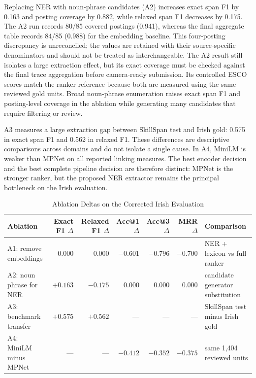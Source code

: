 \documentclass[conference]{IEEEtran}
\begin{document}
Replacing NER with noun-phrase candidates (A2) increases exact span F1 by 0.163 and posting coverage by 0.882, while relaxed span F1 decreases by 0.175. The A2 run records 80/85 covered postings (0.941), whereas the final aggregate table records 84/85 (0.988) for the embedding baseline. This four-posting discrepancy is unreconciled; the values are retained with their source-specific denominators and should not be treated as interchangeable. The A2 result still isolates a large extraction effect, but its exact coverage must be checked against the final trace aggregation before camera-ready submission. Its controlled ESCO scores match the ranker reference because both are measured using the same reviewed gold units. Broad noun-phrase enumeration raises exact span F1 and posting-level coverage in the ablation while generating many candidates that require filtering or review.

A3 measures a large extraction gap between SkillSpan test and Irish gold: 0.575 in exact span F1 and 0.562 in relaxed F1. These differences are descriptive comparisons across domains and do not isolate a single cause. In A4, MiniLM is weaker than MPNet on all reported linking measures. The best encoder decision and the best complete pipeline decision are therefore distinct: MPNet is the stronger ranker, but the proposed NER extractor remains the principal bottleneck on the Irish evaluation.

\begin{table}[!t]
\caption{Ablation Deltas on the Corrected Irish Evaluation}
\label{tab:ablations}
\centering
\small
\begin{tabular}{lrrrrrl}
\toprule
Ablation & Exact F1 $\Delta$ & Relaxed F1 $\Delta$ & Acc@1 $\Delta$ & Acc@3 $\Delta$ & MRR $\Delta$ & Comparison \\
\midrule
A1: remove embeddings & 0.000 & 0.000 & $-0.601$ & $-0.796$ & $-0.700$ & NER + lexicon vs full ranker \\
A2: noun phrase for NER & $+0.163$ & $-0.175$ & 0.000 & 0.000 & 0.000 & candidate generator substitution \\
A3: benchmark transfer & $+0.575$ & $+0.562$ & --- & --- & --- & SkillSpan test minus Irish gold \\
A4: MiniLM minus MPNet & --- & --- & $-0.412$ & $-0.352$ & $-0.375$ & same 1,404 reviewed units \\
\bottomrule
\end{tabular}
\\[1mm]
\par{}
\end{table}
\end{document}

